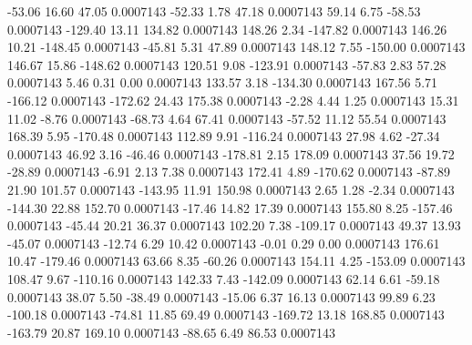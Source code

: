       -53.06       16.60       47.05     0.0007143
      -52.33        1.78       47.18     0.0007143
       59.14        6.75      -58.53     0.0007143
     -129.40       13.11      134.82     0.0007143
      148.26        2.34     -147.82     0.0007143
      146.26       10.21     -148.45     0.0007143
      -45.81        5.31       47.89     0.0007143
      148.12        7.55     -150.00     0.0007143
      146.67       15.86     -148.62     0.0007143
      120.51        9.08     -123.91     0.0007143
      -57.83        2.83       57.28     0.0007143
        5.46        0.31        0.00     0.0007143
      133.57        3.18     -134.30     0.0007143
      167.56        5.71     -166.12     0.0007143
     -172.62       24.43      175.38     0.0007143
       -2.28        4.44        1.25     0.0007143
       15.31       11.02       -8.76     0.0007143
      -68.73        4.64       67.41     0.0007143
      -57.52       11.12       55.54     0.0007143
      168.39        5.95     -170.48     0.0007143
      112.89        9.91     -116.24     0.0007143
       27.98        4.62      -27.34     0.0007143
       46.92        3.16      -46.46     0.0007143
     -178.81        2.15      178.09     0.0007143
       37.56       19.72      -28.89     0.0007143
       -6.91        2.13        7.38     0.0007143
      172.41        4.89     -170.62     0.0007143
      -87.89       21.90      101.57     0.0007143
     -143.95       11.91      150.98     0.0007143
        2.65        1.28       -2.34     0.0007143
     -144.30       22.88      152.70     0.0007143
      -17.46       14.82       17.39     0.0007143
      155.80        8.25     -157.46     0.0007143
      -45.44       20.21       36.37     0.0007143
      102.20        7.38     -109.17     0.0007143
       49.37       13.93      -45.07     0.0007143
      -12.74        6.29       10.42     0.0007143
       -0.01        0.29        0.00     0.0007143
      176.61       10.47     -179.46     0.0007143
       63.66        8.35      -60.26     0.0007143
      154.11        4.25     -153.09     0.0007143
      108.47        9.67     -110.16     0.0007143
      142.33        7.43     -142.09     0.0007143
       62.14        6.61      -59.18     0.0007143
       38.07        5.50      -38.49     0.0007143
      -15.06        6.37       16.13     0.0007143
       99.89        6.23     -100.18     0.0007143
      -74.81       11.85       69.49     0.0007143
     -169.72       13.18      168.85     0.0007143
     -163.79       20.87      169.10     0.0007143
      -88.65        6.49       86.53     0.0007143
